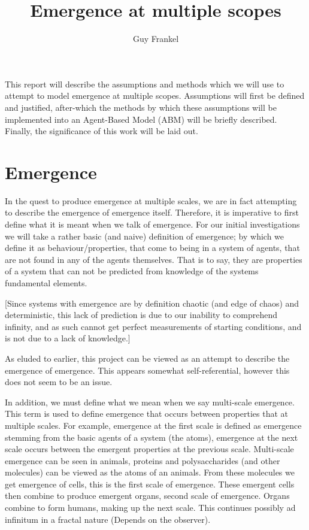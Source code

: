 \documentclass{article}
\title{Emergence at multiple scopes}
\author{Guy Frankel}
\date{}
\begin{document}
\maketitle
\vspace{-6mm}


This report will describe the assumptions and methods which we will use to attempt to model emergence at multiple scopes. Assumptions will first be defined and justified, after-which the methods by which these assumptions will be implemented into an Agent-Based Model (ABM) will be briefly described. Finally, the significance of this work will be laid out.


\section{Emergence}

  In the quest to produce emergence at multiple scales, we are in fact attempting to describe the emergence of emergence itself. Therefore, it is imperative to first define what it is meant when we talk of emergence. For our initial investigations we will take a rather basic (and naive) definition of emergence; by which we define it as behaviour/properties, that come to being in a system of agents, that are not found in any of the agents themselves. That is to say, they are properties of a system that can not be predicted from knowledge of the systems fundamental elements.

  [Since systems with emergence are by definition chaotic (and edge of chaos) and deterministic, this lack of prediction is due to our inability to comprehend infinity, and as such cannot get perfect measurements of starting conditions, and is not due to a lack of knowledge.]

  As eluded to earlier, this project can be viewed as an attempt to describe the emergence of emergence. This appears somewhat self-referential, however this does not seem to be an issue.

  In addition, we must define what we mean when we say multi-scale emergence. This term is used to define emergence that occurs between properties that at multiple scales. For example, emergence at the first scale is defined as emergence stemming from the basic agents of a system (the atoms), emergence at the next scale occurs between the emergent properties at the previous scale. Multi-scale emergence can be seen in animals, proteins and polysaccharides (and other molecules) can be viewed as the atoms of an animals. From these molecules we get emergence of cells, this is the first scale of emergence. These emergent cells then combine to produce emergent organs, second scale of emergence. Organs combine to form humans, making up the next scale. This continues possibly ad infinitum in a fractal nature (Depends on the observer).
\end{document}
